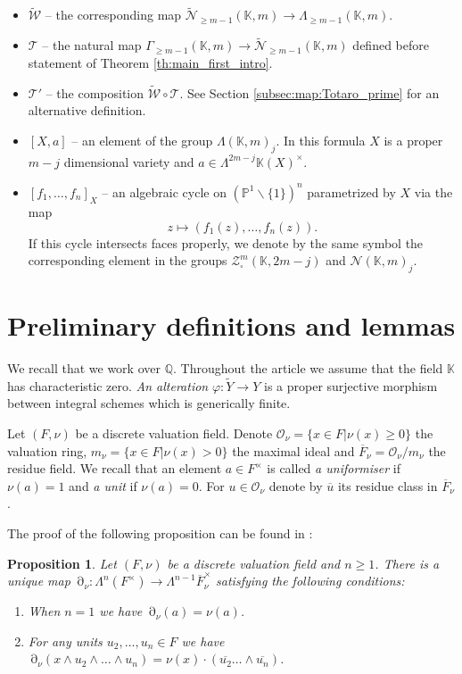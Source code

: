 \documentclass[12pt]{extarticle}
\newtheorem{proposition}[theorem]{Proposition}
\def\mb{\mathbb}
\def\mc{\mathcal}
\def\L{\Lambda}
\def\k{\mb K}
\def\ph{\varphi}
\def\t{\times}
\def\ol{\overline}
\def\wt{\widetilde}
\def\wdw{\wedge\dots\wedge}
\def\bs{\backslash}
\DeclareMathOperator{\ts}{\partial}
\begin{document}
\begin{itemize}
\item $\wt{\mc W}$ -- the corresponding map $\wt {\mc N}_{\geq m-1}(\k,m)\to \Lambda_{\geq m-1}(\k,m)$.
\item $\mc T$ -- the natural map $\Gamma_{\geq m-1}(\k,m)\to \wt {\mc N}_{\geq m-1}(\k,m)$ defined before statement of Theorem \ref{th:main_first_intro}.
\item $\mc T'$ -- the composition $\wt{\mc W}\circ \mc T$. See Section \ref{subsec:map:Totaro_prime} for an alternative definition.
    \item $[X,a]$ -- an element of the group $\L(\k,m)_j$. In this formula $X$ is a proper $m-j$ dimensional variety and $a\in\Lambda^{2m-j}\k(X)^\times$.
    \item $[f_1,\dots, f_n]_X$ -- an algebraic cycle on $(\mb P^1\bs\{1\})^n$ parametrized by $X$ via the map $$z\mapsto (f_1(z),\dots, f_n(z)).$$ If this cycle intersects faces properly, we denote by the same symbol the corresponding element in the groups $\mc Z_\square^m(\k,2m-j)$ and $\mc N(\k,m)_j$.
    
\end{itemize}

\section{Preliminary definitions and
lemmas}
\label{sec:preliminary_def}
We recall that we work over $\mathbb Q$. Throughout the article we assume that the field $\k$ has characteristic zero. \emph{An alteration} $\ph\colon \wt Y\to Y$ is a proper surjective morphism between integral schemes which is generically finite. 

Let $(F,\nu)$ be a discrete valuation field. Denote $\mc O_\nu=\{x\in F|\nu(x)\geq 0\}$ the valuation ring, $m_\nu=\{x\in F|\nu(x)>0\}$  the maximal ideal and $\overline F_\nu =\mc O_\nu/m_\nu$ the residue field. We recall that an element $a\in F^\t$ is called \emph{a uniformiser} if $\nu(a)=1$ and \emph{a unit} if $\nu(a)=0$. For $u\in \mc O_\nu$ denote by $\overline u$ its residue class in $\ol F_\nu$.

The proof of the following proposition can be found in \cite{goncharov1995geometry}:

\begin{proposition}
\label{prop:tame_symbol_classiacal}
Let $(F,\nu)$ be a discrete valuation field and $n\geq 1$. There is a unique map $\ts_\nu\colon \L^n(F^\t)\to \L^{n-1}\ol F_\nu^\t$ satisfying the following conditions:

\begin{enumerate}
    \item When $n=1$ we have $\ts_{\nu}(a)=\nu(a)$.
   \item For any units $u_2,\dots, u_n\in F$ we have $\ts_\nu(x\wedge u_2\wdw u_n)=\nu(x)\cdot( \ol{u_2} \dots \wedge \overline{u_n})$.

\end{enumerate}
\end{proposition}
\end{document}
